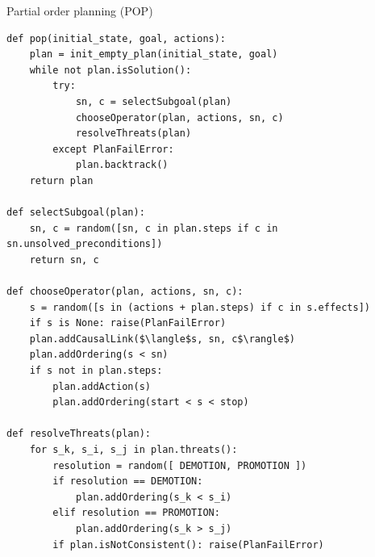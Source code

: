 \begin{algorithm}[H]
\caption{Partial order planning (POP)}
\begin{lstlisting}[mathescape=true]
def pop(initial_state, goal, actions):
    plan = init_empty_plan(initial_state, goal)
    while not plan.isSolution():
        try:
            sn, c = selectSubgoal(plan)
            chooseOperator(plan, actions, sn, c)
            resolveThreats(plan)
        except PlanFailError:
            plan.backtrack()
    return plan

def selectSubgoal(plan):
    sn, c = random([sn, c in plan.steps if c in sn.unsolved_preconditions])
    return sn, c

def chooseOperator(plan, actions, sn, c):
    s = random([s in (actions + plan.steps) if c in s.effects])
    if s is None: raise(PlanFailError)
    plan.addCausalLink($\langle$s, sn, c$\rangle$)
    plan.addOrdering(s < sn)
    if s not in plan.steps:
        plan.addAction(s)
        plan.addOrdering(start < s < stop)

def resolveThreats(plan):
    for s_k, s_i, s_j in plan.threats():
        resolution = random([ DEMOTION, PROMOTION ])
        if resolution == DEMOTION:
            plan.addOrdering(s_k < s_i)
        elif resolution == PROMOTION:
            plan.addOrdering(s_k > s_j)
        if plan.isNotConsistent(): raise(PlanFailError)
\end{lstlisting}
\end{algorithm}

